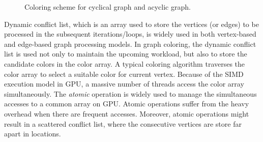 \begin{figure}[h]
\centering
{}%
\hspace{0.4in}
%
\caption{Coloring scheme for cyclical graph and acyclic graph.}
\label{fig:color_scheme}%
\end{figure}

Dynamic conflict list, which is an array used to store the vertices (or edges) to be processed in the subsequent iterations/loops, is widely used in both vertex-based and edge-based graph processing models. In graph coloring, the dynamic conflict list is used not only 
to maintain the upcoming workload, but also to store the candidate colors in the color array. 
A typical coloring algorithm traverses the color array to select a suitable color 
for current vertex. Because of the SIMD execution model in GPU, a massive number of threads access the 
color array simultaneously. The \emph{atomic} operation is widely 
used to manage the simultaneous accesses to a common array on GPU. Atomic operations suffer from the heavy overhead when there are frequent accesses. Moreover, atomic operations might result in a scattered conflict list,  
where the consecutive vertices are store far apart in locations.


